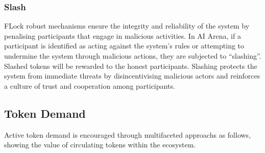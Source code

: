 \documentclass[conference]{IEEEtran}
\begin{document}

        

\subsubsection{Slash} \label{sec: slash}
FLock robust mechanisms ensure the integrity and reliability of the system by penalising participants that engage in malicious activities. In AI Arena, if a participant is identified as acting against the system's rules or attempting to undermine the system through malicious actions, they are subjected to ``slashing''. Slashed tokens will be rewarded to the honest participants. Slashing protects the system from immediate threats by disincentivising malicious actors and reinforces a culture of trust and cooperation among participants. 

\subsection{Token Demand}
Active token demand is encouraged through multifaceted approachs as follows, showing the value of circulating tokens within the ecosystem.
\end{document}
